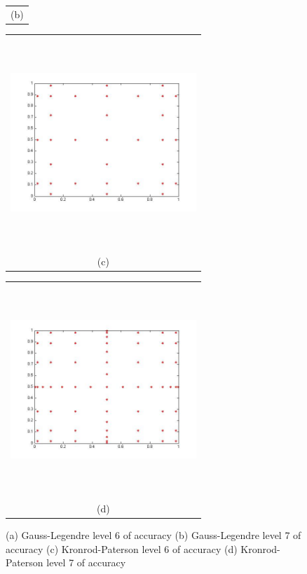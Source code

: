 \documentclass{article}
\newcommand{\Pic}[2][0.85]{\begin{center}\texttt{[image: \#2]}
 \end{center} }
\begin{document}
\begin{figure}[H]
\begin{minipage}{0.6\textwidth}
\begin{tabular}{c}
        (b)
        \end{tabular}
    \end{minipage} 
    \begin{minipage}[b]{0.6\textwidth}
        \begin{tabular}{c}
       \includegraphics[width=7cm,height=8cm,keepaspectratio]{fig/KPU_2_6.jpg}\\
        (c)
        \end{tabular}
    \end{minipage}
    \begin{minipage}{0.6\textwidth}
        \begin{tabular}{c}
	\includegraphics[width=7cm,height=8cm,keepaspectratio]{fig/KPU_2_7.jpg}\\
        (d)
        \end{tabular}
    \end{minipage} 
\caption{(a) Gauss-Legendre level 6 of accuracy
(b) Gauss-Legendre level 7 of accuracy
(c) Kronrod-Paterson level 6 of accuracy
(d) Kronrod-Paterson level 7 of accuracy }
\label{fig1}  
\end{figure}
\end{document}
